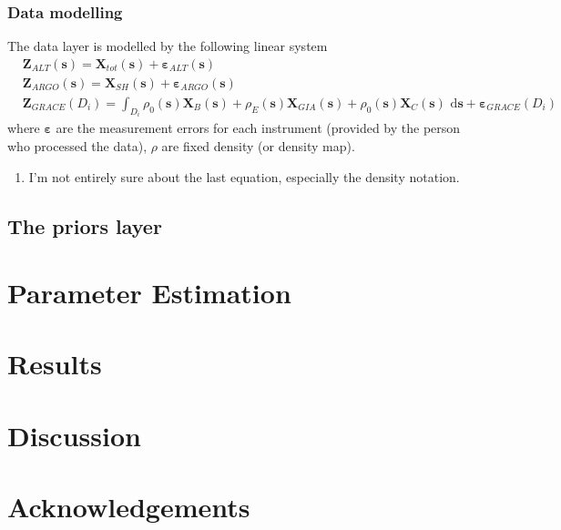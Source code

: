 \documentclass[cmbright,fleqn,referee]{envauth}
\newcommand{\bX}{\bm{X}}
\newcommand{\bs}{\bm{s}}
\newcommand{\bZ}{\bm{Z}}
\newcommand{\ubd}{\,\bm{\mathrm{d}}}
\begin{document}
\subsubsection{Data modelling}
The data layer is modelled by the following linear system
\begin{align}
&\bZ_{ALT}(\bs) = \bX_{tot}(\bs) + \bm{\varepsilon}_{ALT}(\bs) \\
&\bZ_{ARGO}(\bs) = \bX_{SH}(\bs) + \bm{\varepsilon}_{ARGO}(\bs)\\
&\bZ_{GRACE}(D_i) = \int_{D_i} \rho_0(\bs) \bX_{B}(\bs) +  \rho_E(\bs) \bX_{GIA}(\bs) + \rho_0(\bs) \bX_{C}(\bs) \, \ubd \bs + \bm{\varepsilon}_{GRACE}(D_i)
\end{align}
where $\bm{\varepsilon}$ are the measurement errors for each instrument (provided by the person who processed the data), $\rho$ are fixed density (or density map).
\begin{enumerate}
\item I'm not entirely sure about the last equation, especially the density notation.
\end{enumerate}
\subsection{The priors layer}


\section{Parameter Estimation}
\label{s:estimate}



\section{Results}
\label{s:result}

\section{Discussion}
\label{s:discuss}

\section*{Acknowledgements}
\end{document}
